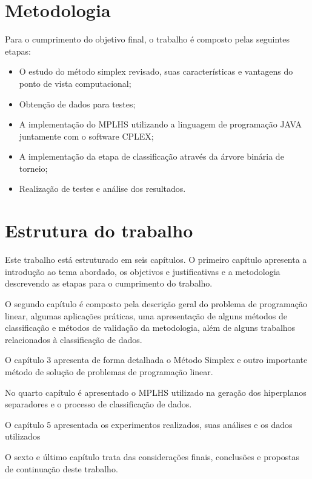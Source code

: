 \section{Metodologia}
Para o cumprimento do objetivo final, o trabalho é composto pelas seguintes etapas:

\begin{itemize} 
\item O estudo do método simplex revisado, suas características e vantagens do ponto de vista computacional;
\item Obtenção de dados para testes;
\item A implementação do  MPLHS utilizando a linguagem de programação JAVA juntamente com o software CPLEX;
\item A implementação da etapa de classificação através da árvore binária de torneio;
\item Realização de testes e análise dos resultados.
\end{itemize}

\section{Estrutura do trabalho}
Este trabalho está estruturado em seis capítulos. O primeiro capítulo apresenta a introdução ao tema abordado, os objetivos e justificativas e a metodologia descrevendo as etapas para o cumprimento do trabalho.

O segundo capítulo é composto pela descrição geral do problema de programação linear, algumas aplicações práticas, uma apresentação de alguns métodos de classificação e métodos de validação da metodologia, além de alguns trabalhos relacionados à classificação de dados.

O capítulo 3 apresenta de forma detalhada o Método Simplex e outro importante método de solução de problemas de programação linear.

No quarto capítulo é apresentado o MPLHS utilizado na geração dos hiperplanos separadores e o processo de classificação de dados.

O capítulo 5 apresentada os experimentos realizados, suas análises e os dados utilizados

O sexto e último capítulo trata das considerações finais, conclusões e propostas de continuação deste trabalho.
